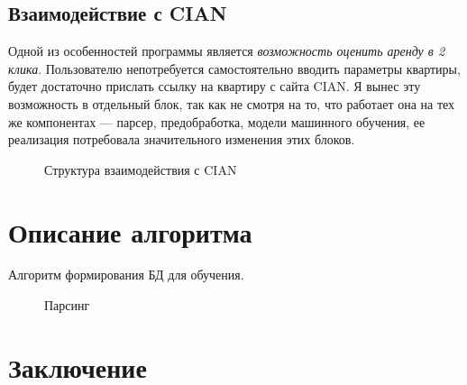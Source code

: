 \documentclass{article}
\begin{document}
		\subsection{Взаимодействие с CIAN}
		
			Одной из особенностей программы является \textit{возможность оценить аренду в 2 клика}. Пользователю непотребуется самостоятельно вводить параметры квартиры, будет достаточно прислать ссылку на квартиру с сайта CIAN. Я вынес эту возможность в отдельный блок, так как не смотря на то, что работает она на тех же компонентах --- парсер, предобработка, модели машинного обучения, ее реализация потребовала значительного изменения этих блоков.
			
			\begin{figure}[H]
				\centering
				\caption{Структура взаимодействия с CIAN}
				\label{fig:cian}
			\end{figure}
	
	\newpage
	\section{Описание алгоритма}	
		
		Алгоритм формирования БД для обучения.
		
		\begin{figure}[H]
			\centering
			\caption{Парсинг}
			\label{fig:algorithm_parsing}
		\end{figure}
	
	\newpage
	\section{Заключение}
		
\end{document}
